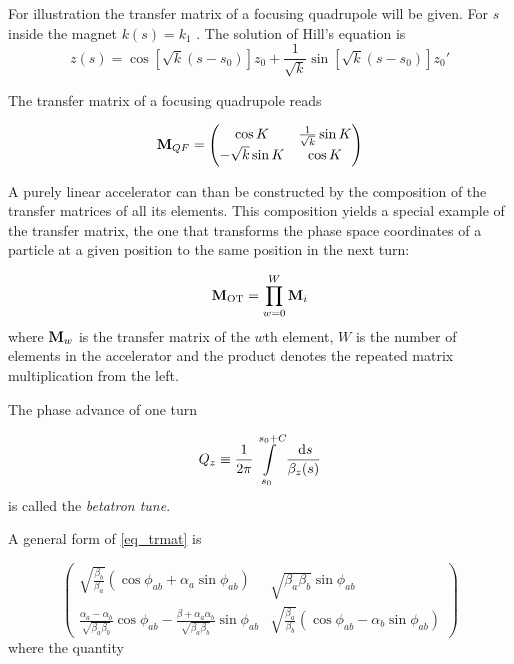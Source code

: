 For illustration the transfer matrix of a focusing quadrupole will be given.
For $s$ inside the magnet $k(s) = k_1$ . The solution of Hill's equation is
\begin{equation}
    z(s) = \cos \left[ \sqrt{k}(s-s_0)\right] z_0 + \frac{1}{\sqrt{k}}\sin\left[\sqrt{k}(s-s_0)\right]z_0'
\end{equation}

The transfer matrix of a focusing quadrupole reads

\begin{equation}
    \mathbf{M}_{QF} =
    \begin{pmatrix}
        \cos K & \frac{1}{\sqrt{k}} \sin K \\
        -\sqrt{k}\sin K & \cos K
    \end{pmatrix}
\end{equation}

A purely linear accelerator can than be constructed by the composition of the transfer matrices of 
all its elements. This composition yields a special example of the transfer matrix, the one that
transforms the phase space coordinates of a particle at a given position to the same position in the
next turn:

\begin{equation}
    \mathbf{M}_\text{OT} = \prod\limits_{w=0}^W \mathbf{M}_i
\end{equation}
where $\mathbf{M}_w$ is the transfer matrix of the $w$th element, $W$ is the number of elements in the
accelerator and the product denotes the repeated matrix multiplication from the left.

The phase advance of one turn

\begin{equation}
    Q_z \equiv \frac{1}{2\pi}\int\limits_{s_0}^{s_0+C} \frac{\;\text{d} s}{\beta_z(s)}
\end{equation}
is called the \emph{betatron tune}.

A general form of \eqref{eq_trmat} is 

\begin{equation}
    \begin{pmatrix}
        \sqrt{\frac{\beta_b}{\beta_a}}(\cos\phi_{ab} + \alpha_a \sin\phi_{ab}) &
        \sqrt{\beta_a\beta_b} \sin\phi_{ab} \\
        \frac{\alpha_a - \alpha_b}{\sqrt{\beta_a\beta_b}}\cos\phi_{ab} - \frac{\beta+\alpha_a\alpha_b}{\sqrt{\beta_a\beta_b}}\sin\phi_{ab} &
        \sqrt{\frac{\beta_a}{\beta_b}}(\cos\phi_{ab} - \alpha_b\sin\phi_{ab})
    \end{pmatrix}
    \label{eq_trmat_01}
\end{equation}
where the quantity

